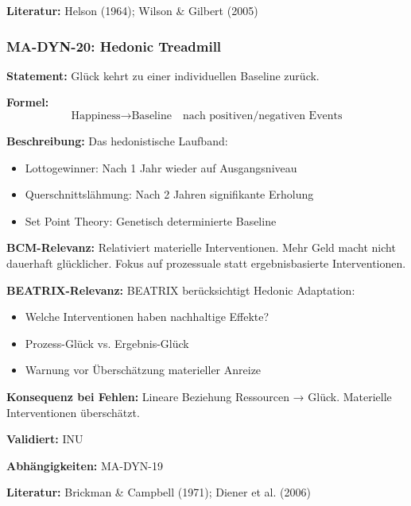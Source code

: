 \textbf{Literatur:} Helson (1964); Wilson \& Gilbert (2005)


\subsubsection*{MA-DYN-20: Hedonic Treadmill}

\textbf{Statement:} Glück kehrt zu einer individuellen Baseline zurück.

\textbf{Formel:}
\begin{equation}
\text{Happiness} \rightarrow \text{Baseline} \quad \text{nach positiven/negativen Events}
\end{equation}

\textbf{Beschreibung:}
Das hedonistische Laufband:
\begin{itemize}
    \item Lottogewinner: Nach 1 Jahr wieder auf Ausgangsniveau
    \item Querschnittslähmung: Nach 2 Jahren signifikante Erholung
    \item Set Point Theory: Genetisch determinierte Baseline
\end{itemize}

\textbf{BCM-Relevanz:}
Relativiert materielle Interventionen. Mehr Geld macht nicht dauerhaft glücklicher. Fokus auf prozessuale statt ergebnisbasierte Interventionen.

\textbf{BEATRIX-Relevanz:}
BEATRIX berücksichtigt Hedonic Adaptation:
\begin{itemize}
    \item Welche Interventionen haben nachhaltige Effekte?
    \item Prozess-Glück vs. Ergebnis-Glück
    \item Warnung vor Überschätzung materieller Anreize
\end{itemize}

\textbf{Konsequenz bei Fehlen:}
Lineare Beziehung Ressourcen → Glück. Materielle Interventionen überschätzt.

\textbf{Validiert:} INU

\textbf{Abhängigkeiten:} MA-DYN-19

\textbf{Literatur:} Brickman \& Campbell (1971); Diener et al. (2006)


